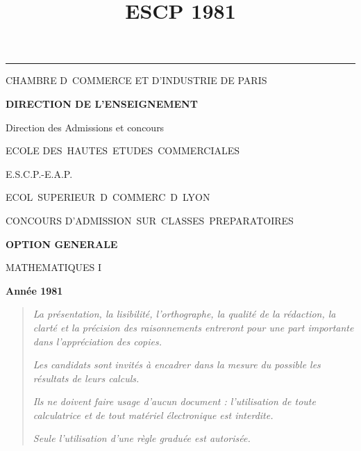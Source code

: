 \documentclass[11pt]{article}%
\title{\bf \vspace{-2cm} ESCP 1981} %
\author{} %
\date{} %
\begin{document}
\maketitle %
\vspace{-1.4cm}\hrule %
\thispagestyle{fancy}

\vspace*{.2cm}




\begin{center}
{\small CHAMBRE D\E\ COMMERCE ET D'INDUSTRIE DE PARIS}

\textbf{DIRECTION DE L'ENSEIGNEMENT}

Direction des Admissions et concours

\underline{\hspace*{3cm}}

{\Large ECOLE DES\ HAUTES\ ETUDES\ COMMERCIALES}

{\Large E.S.C.P.-E.A.P.}

{\Large ECOL\E\ SUPERIEUR\E\ D\E\ COMMERC\E\ D\E\ LYON}{\large }

CONCOURS D'ADMISSION\ SUR\ CLASSES\ PREPARATOIRES

\underline{\hspace*{3cm}}

\textbf{OPTION GENERALE}

{\Large MATHEMATIQUES I}

\textbf{Année 1981}

\underline{\hspace*{3cm}}
\end{center}

\begin{quotation}
\noindent \textsl{La présentation, la lisibilité, l'orthographe, la
qualité
de la rédaction, la clarté et la précision des raisonnements entreront
pour
une part importante dans l'appréciation des copies.}

\noindent \textsl{Les candidats sont invités à encadrer dans la mesure
du
possible les résultats de leurs calculs.}

\noindent \textsl{Ils ne doivent faire usage d'aucun document :
l'utilisation de toute calculatrice et de tout matériel électronique
est
interdite.}

\noindent \textsl{Seule l'utilisation d'une règle graduée est
autorisée.}

\noindent \textsl{\hrulefill }
\end{quotation}
\end{document}
